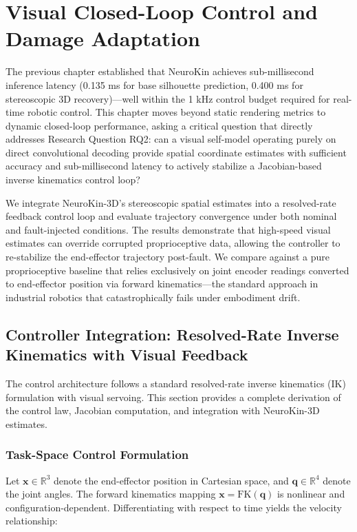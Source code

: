 \documentclass[12pt,a4paper,oneside]{report}
\begin{document}
\chapter{Visual Closed-Loop Control and Damage Adaptation}

The previous chapter established that NeuroKin achieves sub-millisecond inference latency (0.135 ms for base silhouette prediction, 0.400 ms for stereoscopic 3D recovery)—well within the 1 kHz control budget required for real-time robotic control. This chapter moves beyond static rendering metrics to dynamic closed-loop performance, asking a critical question that directly addresses Research Question RQ2: can a visual self-model operating purely on direct convolutional decoding provide spatial coordinate estimates with sufficient accuracy and sub-millisecond latency to actively stabilize a Jacobian-based inverse kinematics control loop?

We integrate NeuroKin-3D's stereoscopic spatial estimates into a resolved-rate feedback control loop and evaluate trajectory convergence under both nominal and fault-injected conditions. The results demonstrate that high-speed visual estimates can override corrupted proprioceptive data, allowing the controller to re-stabilize the end-effector trajectory post-fault. We compare against a pure proprioceptive baseline that relies exclusively on joint encoder readings converted to end-effector position via forward kinematics—the standard approach in industrial robotics that catastrophically fails under embodiment drift.

\section{Controller Integration: Resolved-Rate Inverse Kinematics with Visual Feedback}

The control architecture follows a standard resolved-rate inverse kinematics (IK) formulation with visual servoing. This section provides a complete derivation of the control law, Jacobian computation, and integration with NeuroKin-3D estimates.

\subsection{Task-Space Control Formulation}

Let $\mathbf{x} \in \mathbb{R}^3$ denote the end-effector position in Cartesian space, and $\mathbf{q} \in \mathbb{R}^4$ denote the joint angles. The forward kinematics mapping $\mathbf{x} = \text{FK}(\mathbf{q})$ is nonlinear and configuration-dependent. Differentiating with respect to time yields the velocity relationship:
\end{document}
